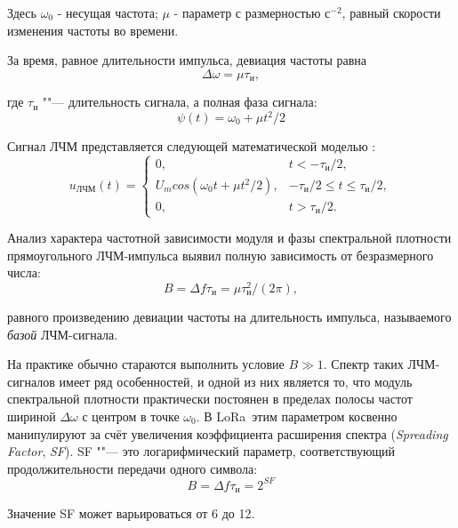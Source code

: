 Здесь $\omega_0$ - несущая частота; $\mu$ - параметр с размерностью с$^{-2}$, 
равный скорости изменения частоты во времени.

За время, равное длительности импульса, девиация частоты равна
\begin{equation}
	\Delta \omega = \mu \tau_{\text{и}},
\end{equation}

где $\tau_{\text{и}}$ ""--- длительность сигнала, а полная фаза сигнала:
\begin{equation}
	\psi(t) = \omega_0 + \mu t{^2}/2
\end{equation}

Сигнал ЛЧМ представляется следующей математической моделью \cite{Baskakov2003}:
\begin{equation}
	u_\text{ЛЧМ}(t) = 
	\begin{cases}
		0, & t < -\tau_\text{и}/2,\\
		U_m cos(\omega_0 t + \mu t{^2}/2), & -\tau_\text{и}/2 \le t \le 
\tau_\text{и}/2,\\
		0, & t > \tau_\text{и}/2.
	\end{cases}
\end{equation}

Анализ характера частотной зависимости модуля и фазы спектральной плотности 
прямоугольного ЛЧМ-импульса выявил \cite{Baskakov2003} полную зависимость от 
безразмерного числа:
\begin{equation}
	B = \Delta f \tau_\text{и} = \mu \tau^{2}_{\text{и}}/(2\pi),
\end{equation}

равного произведению девиации частоты на длительность импульса, называемого 
\textit{базой} ЛЧМ-сигнала.

На практике обычно стараются выполнить условие $B \gg 1$. 
Спектр таких ЛЧМ-сигналов имеет ряд особенностей, и одной из них является то, 
что модуль спектральной плотности практически постоянен в пределах полосы 
частот 
шириной $\Delta \omega$ с центром в точке $\omega_0$.
В LoRa\texttrademark~этим параметром косвенно манипулируют за счёт увеличения 
коэффициента 
расширения спектра (\textit{Spreading Factor}, \textit{SF}).
SF ""--- это логарифмический параметр, соответствующий продолжительности 
передачи одного символа:
\begin{equation}
	B = \Delta f \tau_\text{и} = 2^{SF}
\end{equation}

Значение SF может варьироваться от 6 до 12.

